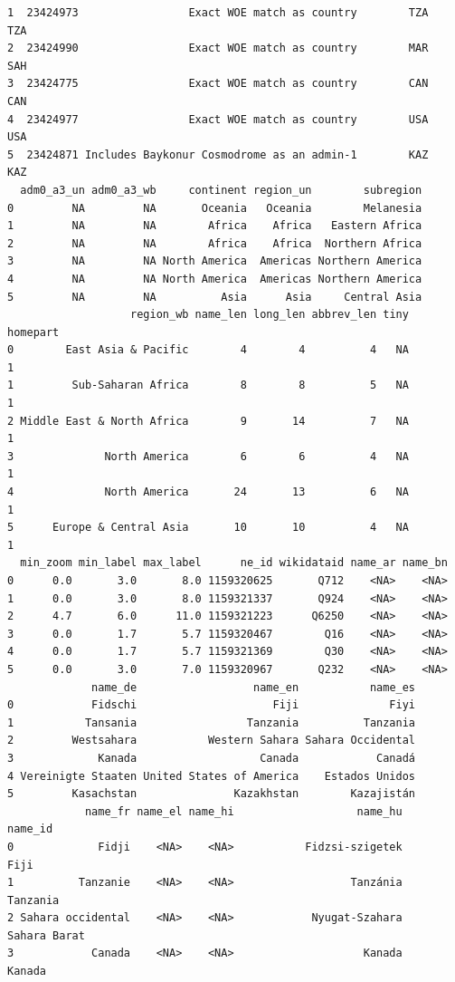 \documentclass[
]{article}
\begin{document}
\begin{verbatim}
1  23424973                 Exact WOE match as country        TZA        TZA
2  23424990                 Exact WOE match as country        MAR        SAH
3  23424775                 Exact WOE match as country        CAN        CAN
4  23424977                 Exact WOE match as country        USA        USA
5  23424871 Includes Baykonur Cosmodrome as an admin-1        KAZ        KAZ
  adm0_a3_un adm0_a3_wb     continent region_un        subregion
0         NA         NA       Oceania   Oceania        Melanesia
1         NA         NA        Africa    Africa   Eastern Africa
2         NA         NA        Africa    Africa  Northern Africa
3         NA         NA North America  Americas Northern America
4         NA         NA North America  Americas Northern America
5         NA         NA          Asia      Asia     Central Asia
                   region_wb name_len long_len abbrev_len tiny homepart
0        East Asia & Pacific        4        4          4   NA        1
1         Sub-Saharan Africa        8        8          5   NA        1
2 Middle East & North Africa        9       14          7   NA        1
3              North America        6        6          4   NA        1
4              North America       24       13          6   NA        1
5      Europe & Central Asia       10       10          4   NA        1
  min_zoom min_label max_label      ne_id wikidataid name_ar name_bn
0      0.0       3.0       8.0 1159320625       Q712    <NA>    <NA>
1      0.0       3.0       8.0 1159321337       Q924    <NA>    <NA>
2      4.7       6.0      11.0 1159321223      Q6250    <NA>    <NA>
3      0.0       1.7       5.7 1159320467        Q16    <NA>    <NA>
4      0.0       1.7       5.7 1159321369        Q30    <NA>    <NA>
5      0.0       3.0       7.0 1159320967       Q232    <NA>    <NA>
             name_de                  name_en           name_es
0            Fidschi                     Fiji              Fiyi
1           Tansania                 Tanzania          Tanzania
2         Westsahara           Western Sahara Sahara Occidental
3             Kanada                   Canada            Canadá
4 Vereinigte Staaten United States of America    Estados Unidos
5         Kasachstan               Kazakhstan        Kazajistán
            name_fr name_el name_hi                   name_hu         name_id
0             Fidji    <NA>    <NA>           Fidzsi-szigetek            Fiji
1          Tanzanie    <NA>    <NA>                  Tanzánia        Tanzania
2 Sahara occidental    <NA>    <NA>            Nyugat-Szahara    Sahara Barat
3            Canada    <NA>    <NA>                    Kanada          Kanada

\end{verbatim}
\end{document}
